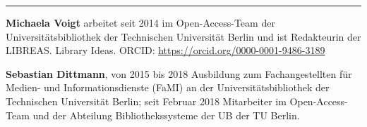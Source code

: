 \begin{center}\rule{0.5\linewidth}{\linethickness}\end{center}

\textbf{Michaela Voigt} arbeitet seit 2014 im Open-Access-Team der
Universitätsbibliothek der Technischen Universität Berlin und ist
Redakteurin der LIBREAS. Library Ideas. ORCID:
\url{https://orcid.org/0000-0001-9486-3189}

\textbf{Sebastian Dittmann}, von 2015 bis 2018 Ausbildung zum
Fachangestellten für Medien- und Informationsdienste (FaMI) an der
Universitätsbibliothek der Technischen Universität Berlin; seit Februar
2018 Mitarbeiter im Open-Access-Team und der Abteilung
Bibliothekssysteme der UB der TU Berlin.
